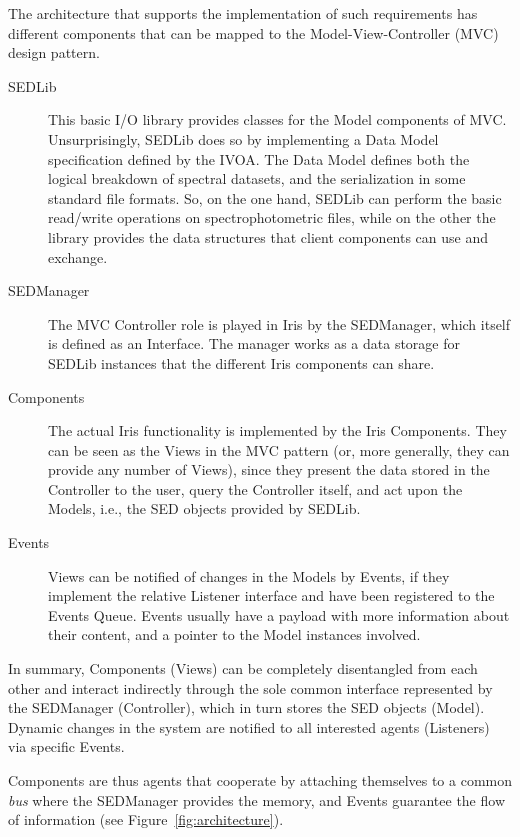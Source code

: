 \documentclass[preprint,authoryear,5p]{elsarticle}
\begin{document}
The architecture that supports the implementation of such requirements has
different components that can be mapped to the Model-View-Controller (MVC)
design pattern.
\begin{description}
\item[SEDLib] This basic I/O library provides
classes for the Model components of MVC. Unsurprisingly, SEDLib does so by
implementing a Data Model specification defined by the IVOA. The Data Model
defines both the logical breakdown of spectral datasets, and the serialization
in some standard file formats. So, on the one hand, SEDLib can perform the basic
read/write operations on spectrophotometric files, while on the other the library
provides the data structures that client components can use and exchange.
\item[SEDManager] The MVC Controller role is played in Iris by the SEDManager,
which itself is defined as an Interface. The manager works as a data storage for
SEDLib instances that the different Iris components can share.
\item[Components] The actual Iris functionality is im\-ple\-ment\-ed by the Iris
Components. They can be seen as the Views in the MVC pattern (or, more
generally, they can provide any number of Views), since they present the data
stored in the Controller to the user, query the Controller itself, and act upon
the Models, i.e., the SED objects provided by SEDLib. 
\item[Events] Views can be
notified of changes in the Models by Events, if they implement the relative
Listener interface and have been registered to the Events Queue. Events usually
have a payload with more information about their content, and a pointer to the
Model instances involved.
\end{description}

\begin{sloppypar}
In summary, Components (Views) can be completely disentangled from each other
and interact indirectly through the sole common interface represented by the
SEDManager (Controller), which in turn stores the SED objects (Model). Dynamic
changes in the system are notified to all interested agents (Listeners) via
specific Events.
\end{sloppypar}

Components are thus agents that cooperate by attaching themselves to a common
\emph{bus} where the SEDManager provides the memory, and Events guarantee the
flow of information (see Figure~\ref{fig:architecture}).
\end{document}
